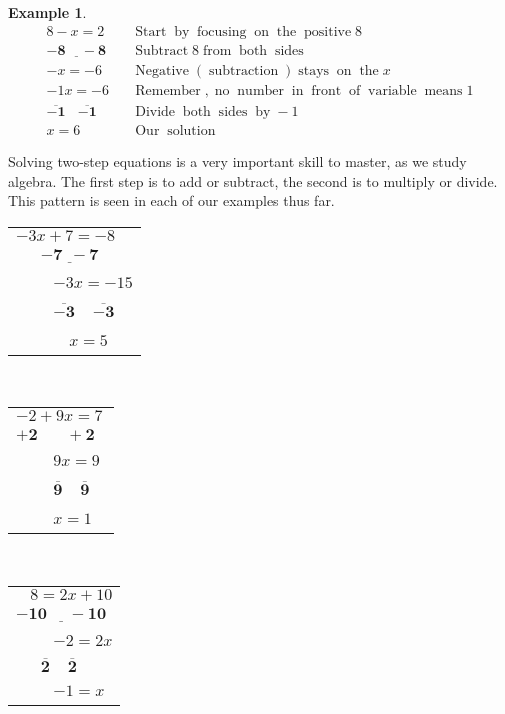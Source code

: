\documentclass[12pt]{book}
\theoremstyle{definition}
\newtheorem{example}{Example}
\newcommand{\tmmathbf}[1]{\ensuremath{\boldsymbol{#1}}}
\newcommand{\tmop}[1]{\ensuremath{\operatorname{#1}}}
\begin{document}
\begin{example}\label{Lin16}
  \begin{eqnarray*}
    8 - x = 2~ &  & \tmop{Start} \tmop{by} \tmop{focusing} \tmop{on} \tmop{the}
    \tmop{positive} 8\\
    \tmmathbf{\underline{- 8 ~~~~~- 8}} &  & \tmop{Subtract} 8 \tmop{from}
    \tmop{both} \tmop{sides}\\
    - x = - 6 &  & \tmop{Negative} (\tmop{subtraction}) \tmop{stays} \tmop{on}
    \tmop{the} x\\
    - 1 x = - 6 &  & \tmop{Remember}, \tmop{no} \tmop{number} \tmop{in}
    \tmop{front} \tmop{of} \tmop{variable} \tmop{means} 1\\
    \tmmathbf{\overline{- 1} ~~~~ \overline{- 1}} &  & \tmop{Divide} \tmop{both}
    \tmop{sides} \tmop{by} - 1\\
    x = 6 &  & \tmop{Our} \tmop{solution}
  \end{eqnarray*}
\end{example}
Solving two-step equations is a very important skill to master, as we study algebra. The first step is to add or subtract, the second is to multiply or divide. This pattern is seen in each of our examples thus far.\par
  \begin{table}[h]
    \begin{tabular}{l}
      $- 3 x + 7 = - 8$\\
      $ ~~~~~~~\tmmathbf{\underline{- 7 ~~- 7}}~$\\
      ~~~~ $- 3 x = - 15$\\
      ~~~~ $ \tmmathbf{\overline{- 3} ~~~~~ \overline{- 3}}$\\
      ~~~~~~ $x = 5$
    \end{tabular}~~~~~~~~~~~~ 
		\begin{tabular}{l}
      $- 2 + 9 x = 7~$\\
      \underline{$\tmmathbf{+ 2 ~~~~~~~~+ 2}$}\\
      ~~~~ $9 x = 9$\\
      ~~~~ $ \tmmathbf{ \overline{9} ~~~~~ \overline{9}}$\\
      ~~~~ $x = 1$
    \end{tabular}~~~~~~~~~~~~
		\begin{tabular}{l}
      $~~~~8 = 2 x + 10$\\
      $\tmmathbf{\underline{- 10 ~~~~~~ - 10} }$\\
      ~~~~ $- 2 = 2 x$\\
      $~~~~~~~\tmmathbf{\overline{2} ~~~~~ \overline{2}}$\\
      ~~~~ $- 1 = x$
    \end{tabular}
  \end{table}
\end{document}
